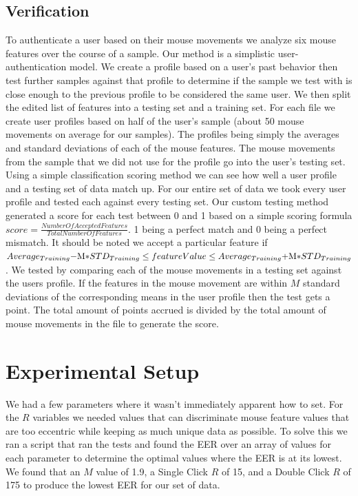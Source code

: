 \documentclass[conference]{IEEEtran}
\begin{document}
\subsection{Verification}
	To authenticate a user based on their mouse movements we analyze six mouse features over the course of a sample. Our method is a simplistic user-authentication model. We create a profile based on a user's past behavior then test further samples against that profile to determine if the sample we test with is close enough to the previous profile to be considered the same user.  
We then split the edited list of features into a testing set and a training set. For each file we create user profiles based on half of the user's sample (about 50 mouse movements on average for our samples). The profiles being simply the averages and standard deviations of each of the mouse features. The mouse movements from the sample that we did not use for the profile go into the user's testing set.
Using a simple classification scoring method we can see how well a user profile and a testing set of data match up. For our entire set of data we took every user profile and tested each against every testing set. Our custom testing method generated a score for each test between 0 and 1 based on a simple scoring formula \( score = \frac{Number Of Accepted Features}{Total Number Of Features} \). 1 being a perfect match and 0 being a perfect mismatch. It should be noted we accept a particular feature if \(Average_{Training} - $M$ * STD_{Training} \leq featureValue \leq Average_{Training} + $M$ * STD_{Training} \).
We tested by comparing each of the mouse movements in a testing set against the users profile. If the features in the mouse movement are within $M$ standard deviations of the corresponding means in the user profile then the test gets a point. The total amount of points accrued is divided by the total amount of mouse movements in the file to generate the score.
	


\section{Experimental Setup}
We had a few parameters where it wasn’t immediately apparent how to set. For the $R$ variables we needed values that can discriminate mouse feature values that are too eccentric while keeping as much unique data as possible. To solve this we ran a script that ran the tests and found the EER over an array of values for each parameter to determine the optimal values where the EER is at its lowest. We found that an $M$ value of 1.9, a Single Click $R$ of 15, and a Double Click $R$ of 175 to produce the lowest EER for our set of data.
\end{document}

